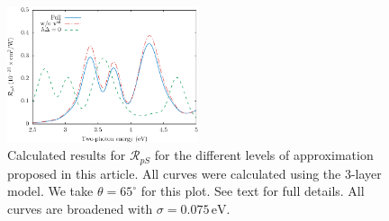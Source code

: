 \begin{figure}[H]
\centering
\includegraphics[width=0.5\textwidth]{content/figures/fig-Si1x1-Mejia_RpS_improvements}
\caption{Calculated results for $\mathcal{R}_{pS}$ for the different levels of
approximation proposed in this article. All curves were calculated using the
3-layer model. We take $\theta=65^{\circ}$ for this plot. See text for full
details. All curves are broadened with $\sigma=0.075\,\text{eV}$.}
\label{fig:improvements}
\end{figure}


\stopcontents[chapters]
